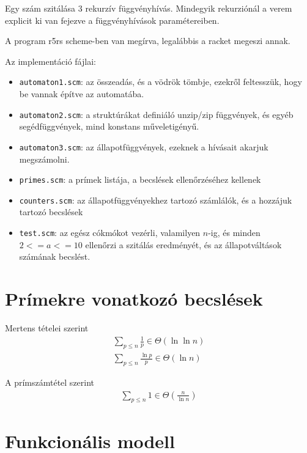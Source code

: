 \documentclass{article}
\begin{document}
Egy szám szitálása 3 rekurzív függvényhívás.
Mindegyik rekurziónál a verem explicit ki van fejezve a függvényhívások paramétereiben.

A program r5rs scheme-ben van megírva, legalábbis a racket megeszi annak.

Az implementáció fájlai:
\begin{itemize}
\item \texttt{automaton1.scm}: az összeadás, és a vödrök tömbje, ezekről feltesszük, hogy be vannak építve az automatába.
\item \texttt{automaton2.scm}: a struktúrákat definiáló unzip/zip függvények, és egyéb segédfüggvények, mind konstans műveletigényű.
\item \texttt{automaton3.scm}: az állapotfüggvények, ezeknek a hívásait akarjuk megszámolni.
\item \texttt{primes.scm}: a prímek listája, a becslések ellenőrzéséhez kellenek
\item \texttt{counters.scm}: az állapotfüggvényekhez tartozó számlálók, és a hozzájuk tartozó becslések
\item \texttt{test.scm}: az egész cókmókot vezérli, valamilyen $n$-ig, és minden $2<=a<=10$ ellenőrzi a szitálás eredményét, és az állapotváltások számának becslést.
\end{itemize}

\section{Prímekre vonatkozó becslések}

Mertens tételei szerint
\begin{align*}
\sum_{p \le n}\frac{1}{p} \in \Theta(\ln{\ln{n}}) \\
\sum_{p \le n}\frac{\ln{p}}{p} \in \Theta(\ln{n})
\end{align*}

A prímszámtétel szerint
\begin{align*}
\sum_{p \le n}1 \in \Theta \left( \frac{n}{\ln{n}} \right)
\end{align*}

\section{Funkcionális modell}
\end{document}
